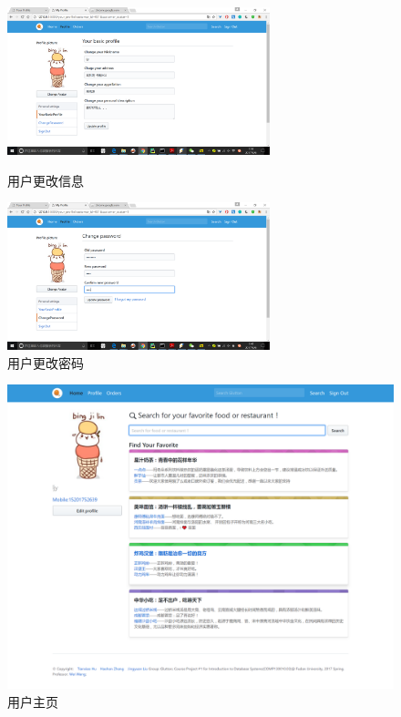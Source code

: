 \documentclass[12pt, oneside,a4paper]{article}
\begin{document}
\begin{itemize}
  \begin{figure}[H]
   \begin{minipage}[t]{0.5\linewidth}
    \centering
     \includegraphics[width=3in]{cu-profile.jpg}
     \caption{\small{用户更改信息}}
   \end{minipage}
   \begin{minipage}[t]{0.5\linewidth}
    \centering
     \includegraphics[width=3in]{cu-password.jpg}
      \caption{\small{用户更改密码}}
   \end{minipage}
   \end{figure}

  \begin{figure}[H]
   \centering
     \includegraphics[width=6.00in]{cu-home.png}
     \caption{\small{用户主页}}
  \end{figure}



\end{itemize}
\end{document}
